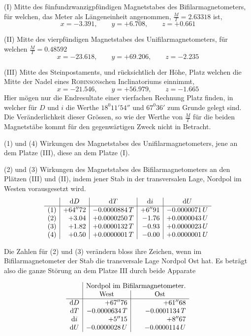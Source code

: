 (I) Mitte des fünfundzwanzigpfündigen Magnetstabes des Bifilarmagnetometers, für welchen, das Meter als Längeneinheit angenommen, $\frac{M}{T}=2.63318$ ist,
\[
x=-3.391,\qquad y=+6.708,\qquad z=+0.661
\]

(II) Mitte des vierpfündigen Magnetstabes des Unifilarmagnetometers, für welchen $\frac{M}{T}=0.48592$
\[
x=-23.618,\qquad y=+69.206,\qquad z=-2.235
\]

(III) Mitte des Steinpostaments, und rücksichtlich der Höhe, Platz welchen die Mitte der Nadel eines \textsc{Robinson}schen Inclinatoriums einnimmt,
\[
x=-21.546,\qquad y=+56.979,\qquad z=-1.665
\]
Hier mögen nur die Endresultate einer vierfachen Rechnung Platz finden, in welcher für $D$ und $i$ die Werthe $18^0 11'54''$ und $67^0 36'$ zum Grunde gelegt sind. Die Veränderlichkeit dieser Grössen, so wie der Werthe von $\frac{M}{T}$ für die beiden Magnetstäbe kommt für den gegenwärtigen Zweck nicht in Betracht.

(1) und (4) Wirkungen des Magnetstabes des Unifilarmagnetometers, jene an dem Platze (III), diese an dem Platze (I).

(2) und (3) Wirkungen des Magnetstabes des Bifilarmagnetometers an den Plätzen (III) und (II), indem jener Stab in der transversalen Lage, Nordpol im Westen vorausgesetzt wird.
\[
\begin{array}{c|r|r|r|r}
&\multicolumn{1}{c|}{\mathrm{d}D}&\multicolumn{1}{c|}{\mathrm{d}T}&\multicolumn{1}{c|}{\mathrm{d}i}&\multicolumn{1}{c}{\mathrm{d}U}\\\hline
(1)&+64''72&-0.0000884\,T&+6''91&-0.0000071\,U\\
(2)&+3.04&+0.0000250\,T&-1.76&+0.0000043\,U\\
(3)&+1.82&+0.0000132\,T&-0.93&+0.0000023\,U\\
(4)&+0.50&+0.0000001\,T&-0.00&+0.0000001\,U
\end{array}
\]

Die Zahlen für (2) und (3) verändern bloss ihre Zeichen, wenn im Bifilarmagnetometer der Stab die transversale Lage Nordpol Ost hat. Es beträgt also die ganze Störung an dem Platze III durch beide Apparate
\par\clearpage
{}
\[
\begin{array}{c|r|r}
&\multicolumn{2}{c}{\text{Nordpol im Bifilarmagnetometer.}}\\
&\multicolumn{1}{c|}{\text{West}}&\multicolumn{1}{c}{\text{Ost}}\\\hline
\mathrm{d}D&+67''76&+61''68\\
\mathrm{d}T&-0.0000634\,T&-0.0001134\,T\\
\mathrm{d}i&+5''15&+8''67\\
\mathrm{d}U&-0.0000028\,U&-0.0000114\,U
\end{array}
\]

